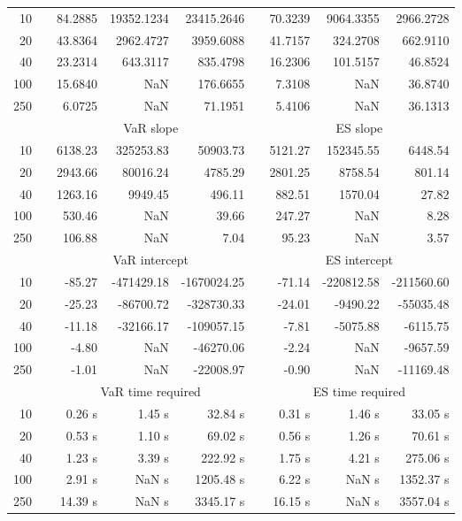 {\begin{table}[h]
\begin{tabular}{rr rrr r rrr}
10 &&  84.2885 & 19352.1234 & 23415.2646 & & 70.3239 & 9064.3355 & 2966.2728 \\ 
20 &&  43.8364 & 2962.4727 & 3959.6088 & & 41.7157 & 324.2708 & 662.9110 \\ 
40 &&  23.2314 & 643.3117 & 835.4798 & & 16.2306 & 101.5157 & 46.8524 \\ 
100 &&  15.6840 &    NaN & 176.6655 & & 7.3108 &    NaN & 36.8740 \\ 
250 &&  6.0725 &    NaN & 71.1951 & & 5.4106 &    NaN & 36.1313 \\ 
\hline 
 & & \multicolumn{3}{c}{ VaR slope} && \multicolumn{3}{c}{ES slope} \\ \cline{3-5}  \cline{7-9}
10 && 6138.23 & 325253.83 & 50903.73 && 5121.27 & 152345.55 & 6448.54 \\ 
20 && 2943.66 & 80016.24 & 4785.29 && 2801.25 & 8758.54 & 801.14 \\ 
40 && 1263.16 & 9949.45 & 496.11 && 882.51 & 1570.04 & 27.82 \\ 
100 && 530.46 &  NaN & 39.66 && 247.27 &  NaN & 8.28 \\ 
250 && 106.88 &  NaN & 7.04 && 95.23 &  NaN & 3.57 \\ 
\hline 
 & & \multicolumn{3}{c}{ VaR intercept} &&  \multicolumn{3}{c}{ES intercept} \\ \cline{3-5}  \cline{7-9}
10 &&  -85.27 & -471429.18 & -1670024.25 && -71.14 & -220812.58 & -211560.60 \\ 
20 &&  -25.23 & -86700.72 & -328730.33 && -24.01 & -9490.22 & -55035.48 \\ 
40 &&  -11.18 & -32166.17 & -109057.15 && -7.81 & -5075.88 & -6115.75 \\ 
100 &&  -4.80 &  NaN & -46270.06 && -2.24 &  NaN & -9657.59 \\ 
250 &&  -1.01 &  NaN & -22008.97 && -0.90 &  NaN & -11169.48 \\ 
\hline 
 & & \multicolumn{3}{c}{VaR time required} && \multicolumn{3}{c}{ES time required} \\ \cline{3-5}  \cline{7-9}
10 & & 0.26 s & 1.45 s & 32.84 s && 0.31 s & 1.46 s & 33.05 s \\ 
20 & & 0.53 s & 1.10 s & 69.02 s && 0.56 s & 1.26 s & 70.61 s \\ 
40 & & 1.23 s & 3.39 s & 222.92 s && 1.75 s & 4.21 s & 275.06 s \\ 
100 & & 2.91 s &  NaN s & 1205.48 s && 6.22 s &  NaN s & 1352.37 s \\ 
250 & & 14.39 s &  NaN s & 3345.17 s && 16.15 s &  NaN s & 3557.04 s \\ 

\end{tabular}
\end{table}}
